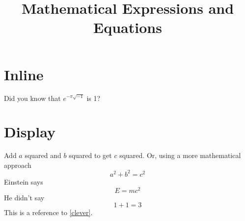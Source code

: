 \documentclass{article}
\title{Mathematical Expressions and Equations}
\begin{document}
    \maketitle
    \section*{Inline}
	Did you know that $e^{-\pi\sqrt{-1}}$ is 1?

    \section*{Display}
    Add $a$ squared and $b$ squared
    to get $c$ squared. Or, using
    a more mathematical approach
    \begin{equation}
    a^2 + b^2 = c^2
    \end{equation}
    Einstein says
    \begin{equation}
    E = mc^2 \label{clever}
    \end{equation}
    He didn’t say
    \begin{equation}
    1 + 1 = 3 \tag{dumb}
    \end{equation}
    This is a reference to
    \eqref{clever}.    
\end{document}

